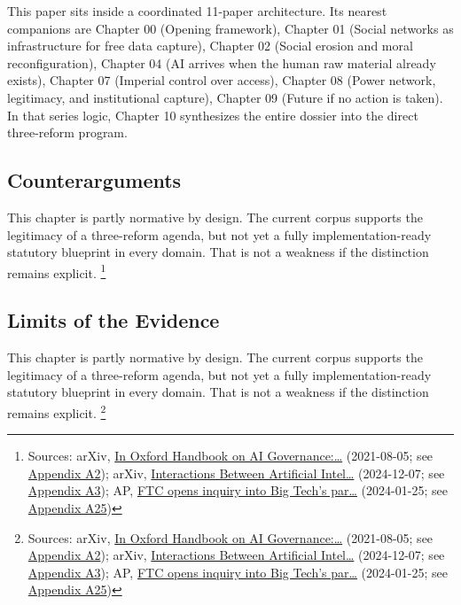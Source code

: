 \documentclass[
  american,
  11pt,
  letterpaper,
]{article}
\begin{document}
This paper sits inside a coordinated 11-paper architecture. Its nearest
companions are Chapter 00 (Opening framework), Chapter 01 (Social
networks as infrastructure for free data capture), Chapter 02 (Social
erosion and moral reconfiguration), Chapter 04 (AI arrives when the
human raw material already exists), Chapter 07 (Imperial control over
access), Chapter 08 (Power network, legitimacy, and institutional
capture), Chapter 09 (Future if no action is taken). In that series
logic, Chapter 10 synthesizes the entire dossier into the direct
three-reform program.

\subsection{Counterarguments}\label{counterarguments-10}

This chapter is partly normative by design. The current corpus supports
the legitimacy of a three-reform agenda, but not yet a fully
implementation-ready statutory blueprint in every domain. That is not a
weakness if the distinction remains explicit. \footnote{Sources: arXiv,
  \href{https://arxiv.org/abs/2108.07700}{In Oxford Handbook on AI
  Governance:\ldots{}} (2021-08-05; see
  \hyperref[ch-10-appendix-a2-in-oxford-handbook-on-ai-governance-the-role-of-workers-in-ai-ethics-and-governance]{Appendix
  A2}); arXiv, \href{https://arxiv.org/abs/2412.05761}{Interactions
  Between Artificial Intel\ldots{}} (2024-12-07; see
  \hyperref[ch-10-appendix-a3-interactions-between-artificial-intelligence-and-digital-public-infrastructure-concepts-benefits-and-challenges]{Appendix
  A3}); AP,
  \href{https://apnews.com/article/67feef411ef311f0be543f546ef34b3d}{FTC
  opens inquiry into Big Tech's par\ldots{}} (2024-01-25; see
  \hyperref[ch-10-appendix-a25-ftc-opens-inquiry-into-big-tech-s-partnerships-with-leading-ai-startups]{Appendix
  A25})}

\subsection{Limits of the Evidence}\label{limits-of-the-evidence-10}

This chapter is partly normative by design. The current corpus supports
the legitimacy of a three-reform agenda, but not yet a fully
implementation-ready statutory blueprint in every domain. That is not a
weakness if the distinction remains explicit. \footnote{Sources: arXiv,
  \href{https://arxiv.org/abs/2108.07700}{In Oxford Handbook on AI
  Governance:\ldots{}} (2021-08-05; see
  \hyperref[ch-10-appendix-a2-in-oxford-handbook-on-ai-governance-the-role-of-workers-in-ai-ethics-and-governance]{Appendix
  A2}); arXiv, \href{https://arxiv.org/abs/2412.05761}{Interactions
  Between Artificial Intel\ldots{}} (2024-12-07; see
  \hyperref[ch-10-appendix-a3-interactions-between-artificial-intelligence-and-digital-public-infrastructure-concepts-benefits-and-challenges]{Appendix
  A3}); AP,
  \href{https://apnews.com/article/67feef411ef311f0be543f546ef34b3d}{FTC
  opens inquiry into Big Tech's par\ldots{}} (2024-01-25; see
  \hyperref[ch-10-appendix-a25-ftc-opens-inquiry-into-big-tech-s-partnerships-with-leading-ai-startups]{Appendix
  A25})}
\end{document}
